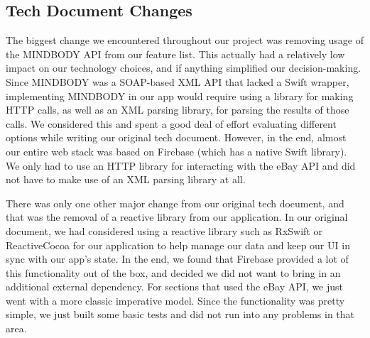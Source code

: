 \subsection{Tech Document Changes}
The biggest change we encountered throughout our project was removing usage of the MINDBODY API from our feature list. This actually had a relatively low impact on our technology choices, and if anything simplified our decision-making. Since MINDBODY was a SOAP-based XML API that lacked a Swift wrapper, implementing MINDBODY in our app would require using a library for making HTTP calls, as well as an XML parsing library, for parsing the results of those calls. We considered this and spent a good deal of effort evaluating different options while writing our original tech document. However, in the end, almost our entire web stack was based on Firebase (which has a native Swift library). We only had to use an HTTP library for interacting with the eBay API and did not have to make use of an XML parsing library at all.

There was only one other major change from our original tech document, and that was the removal of a reactive library from our application. In our original document, we had considered using a reactive library such as RxSwift or ReactiveCocoa for our application to help manage our data and keep our UI in sync with our app's state. In the end, we found that Firebase provided a lot of this functionality out of the box, and decided we did not want to bring in an additional external dependency. For sections that used the eBay API, we just went with a more classic imperative model. Since the functionality was pretty simple, we just built some basic tests and did not run into any problems in that area.